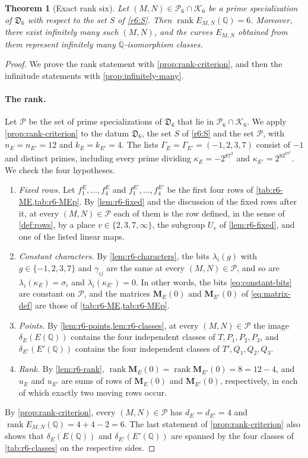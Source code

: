 \documentclass[12pt,oneside,openany]{book}
\theoremstyle{definition}
\theoremstyle{plain}
\numberwithin{equation}{chapter}
\theoremstyle{plain}
\newtheorem{theorem}{Theorem}[chapter]
\theoremstyle{definition}
\theoremstyle{remark}
\newcommand{\Q}{\mathbb Q}
\newcommand{\Qbar}{\overline{\mathbb Q}}
\DeclareMathOperator{\rk}{rank}
\newcommand{\datum}{\mathfrak D}
\newcommand{\cP}{\mathcal P}
\newcommand{\cK}{\mathcal K}
\begin{document}
\begin{theorem}[Exact rank six]\label{thm:r6}
Let $(M,N)\in\cP_6\cap\cK_6$ be a prime specialization of $\datum_6$ with respect to the set $S$ of \eqref{r6:S}. Then $\rk E_{M,N}(\Q)=6$. Moreover, there exist infinitely many such $(M,N)$, and the curves $E_{M,N}$ obtained from them represent infinitely many $\Qbar$-isomorphism classes.
\end{theorem}

\begin{proof}
We prove the rank statement with \cref{prop:rank-criterion}, and then the infinitude statements with \cref{prop:infinitely-many}.

\paragraph{The rank.} Let $\cP$ be the set of prime specializations of $\datum_6$ that lie in $\cP_6\cap\cK_6$. We apply \cref{prop:rank-criterion} to the datum $\datum_6$, the set $S$ of \eqref{r6:S} and the set $\cP$, with $n_E=n_{E'}=12$ and $k_E=k_{E'}=4$. The lists $\Gamma_E=\Gamma_{E'}=(-1,2,3,7)$ consist of $-1$ and distinct primes, including every prime dividing $\kappa_E=-2^87^2$ and $\kappa_{E'}=2^83^67^2$. We check the four hypotheses.
\begin{enumerate}[label=(\roman*)]
\item \emph{Fixed rows.} Let $f^E_1,\dots,f^E_4$ and $f^{E'}_1,\dots,f^{E'}_4$ be the first four rows of \cref{tab:r6-ME,tab:r6-MEp}. By \cref{lem:r6-fixed} and the discussion of the fixed rows after it, at every $(M,N)\in\cP$ each of them is the row defined, in the sense of \cref{def:rows}, by a place $v\in\{2,3,7,\infty\}$, the subgroup $U_v$ of \cref{lem:r6-fixed}, and one of the listed linear maps.
\item \emph{Constant characters.} By \cref{lem:r6-characters}, the bits $\lambda_i(g)$ with $g\in\{-1,2,3,7\}$ and $\gamma_{ij}$ are the same at every $(M,N)\in\cP$, and so are $\lambda_i(\kappa_E)=\sigma_i$ and $\lambda_i(\kappa_{E'})=0$. In other words, the bits \eqref{eq:constant-bits} are constant on $\cP$, and the matrices $\mathbf M_E(0)$ and $\mathbf M_{E'}(0)$ of \eqref{eq:matrix-def} are those of \cref{tab:r6-ME,tab:r6-MEp}.
\item \emph{Points.} By \cref{lem:r6-points,lem:r6-classes}, at every $(M,N)\in\cP$ the image $\delta_E(E(\Q))$ contains the four independent classes of $T,P_1,P_2,P_3$, and $\delta_{E'}(E'(\Q))$ contains the four independent classes of $T',Q_1,Q_2,Q_3$.
\item \emph{Rank.} By \cref{lem:r6-rank}, $\rk\mathbf M_E(0)=\rk\mathbf M_{E'}(0)=8=12-4$, and $u_E$ and $u_{E'}$ are sums of rows of $\mathbf M_E(0)$ and $\mathbf M_{E'}(0)$, respectively, in each of which exactly two moving rows occur.
\end{enumerate}
By \cref{prop:rank-criterion}, every $(M,N)\in\cP$ has $d_E=d_{E'}=4$ and $\rk E_{M,N}(\Q)=4+4-2=6$. The last statement of \cref{prop:rank-criterion} also shows that $\delta_E(E(\Q))$ and $\delta_{E'}(E'(\Q))$ are spanned by the four classes of \cref{tab:r6-classes} on the respective sides.


\end{proof}
\end{document}
